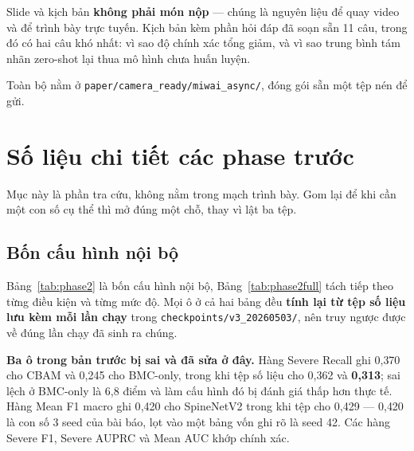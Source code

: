 \documentclass[11pt,a4paper]{article}
\begin{document}
Slide và kịch bản \textbf{không phải món nộp} --- chúng là nguyên liệu để quay video và để trình
bày trực tuyến. Kịch bản kèm phần hỏi đáp đã soạn sẵn 11 câu, trong đó có hai câu khó nhất: vì sao
độ chính xác tổng giảm, và vì sao trung bình tám nhãn zero-shot lại thua mô hình chưa huấn luyện.

Toàn bộ nằm ở \texttt{paper/camera\_ready/miwai\_async/}, đóng gói sẵn một tệp nén để gửi.

\section{Số liệu chi tiết các phase trước}

Mục này là phần tra cứu, không nằm trong mạch trình bày. Gom lại để khi cần một con số cụ thể thì
mở đúng một chỗ, thay vì lật ba tệp.

\subsection{Bốn cấu hình nội bộ}

Bảng~\ref{tab:phase2} là bốn cấu hình nội bộ, Bảng~\ref{tab:phase2full} tách tiếp theo từng điều
kiện và từng mức độ. Mọi ô ở cả hai bảng đều \textbf{tính lại từ tệp số liệu lưu kèm mỗi lần chạy}
trong \texttt{checkpoints/v3\_20260503/}, nên truy ngược được về đúng lần chạy đã sinh ra chúng.

\textbf{Ba ô trong bản trước bị sai và đã sửa ở đây.} Hàng Severe Recall ghi 0{,}370 cho CBAM và
0{,}245 cho BMC-only, trong khi tệp số liệu cho 0{,}362 và \textbf{0{,}313}; sai lệch ở BMC-only
là 6{,}8 điểm và làm cấu hình đó bị đánh giá thấp hơn thực tế. Hàng Mean F1 macro ghi 0{,}420 cho
SpineNetV2 trong khi tệp cho 0{,}429 --- 0{,}420 là con số 3 seed của bài báo, lọt vào một bảng
vốn ghi rõ là seed 42. Các hàng Severe F1, Severe AUPRC và Mean AUC khớp chính xác.
\end{document}
